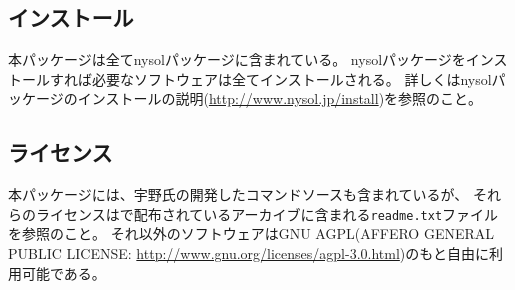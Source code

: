 \subsection{インストール}
本パッケージは全てnysolパッケージに含まれている。
nysolパッケージをインストールすれば必要なソフトウェアは全てインストールされる。
詳しくはnysolパッケージのインストールの説明(\url{http://www.nysol.jp/install})を参照のこと。

\subsection{ライセンス}
本パッケージには、宇野氏の開発したコマンドソースも含まれているが、
それらのライセンスは\cite{UnoWeb}で配布されているアーカイブに含まれる\verb|readme.txt|ファイルを参照のこと。
それ以外のソフトウェアはGNU AGPL(AFFERO GENERAL PUBLIC LICENSE: \url{http://www.gnu.org/licenses/agpl-3.0.html})のもと自由に利用可能である。

